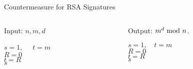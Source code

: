 \begin{frame}{Countermeasure for RSA Signatures}
\begin{columns}[T] %
\begin{column}{.5\textwidth}
Input: $n,m,d$
{\small
{
\setlength{\interspacetitleruled}{0pt}%
\setlength{\algotitleheightrule}{0pt}%
    \begin{algorithm}[H]
$s= 1,\quad$
$t = m$\\
 	{
            $R=0$\\
            $t=R$\\
  	}
  	\Return $s$\\
\end{algorithm}}}
\end{column}%
\hfill%
\begin{column}{.5\textwidth}
Output: $m^d\textrm{~mod~} n$.
{\small
{
\setlength{\interspacetitleruled}{0pt}%
\setlength{\algotitleheightrule}{0pt}%
\begin{algorithm}[H]
$s= 1,\quad t = m$\\
 	{
            $R=0$\\
            $t=R$\\
  	}
  	\Return $s$
\end{algorithm}}}
\end{column}%
\end{columns}
\end{frame}